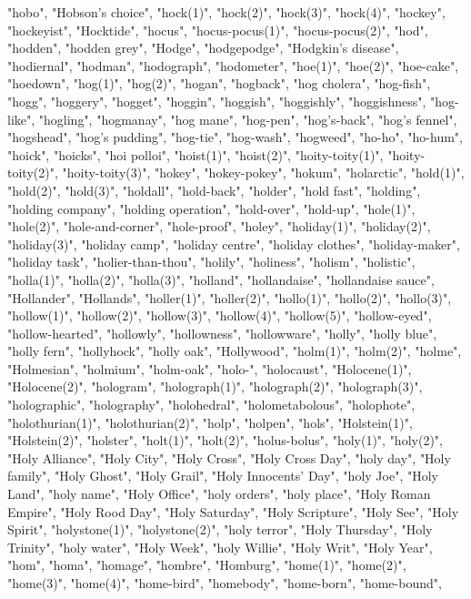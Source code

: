"hobo",
"Hobson's choice",
"hock(1)",
"hock(2)",
"hock(3)",
"hock(4)",
"hockey",
"hockeyist",
"Hocktide",
"hocus",
"hocus-pocus(1)",
"hocus-pocus(2)",
"hod",
"hodden",
"hodden grey",
"Hodge",
"hodgepodge",
"Hodgkin's disease",
"hodiernal",
"hodman",
"hodograph",
"hodometer",
"hoe(1)",
"hoe(2)",
"hoe-cake",
"hoedown",
"hog(1)",
"hog(2)",
"hogan",
"hogback",
"hog cholera",
"hog-fish",
"hogg",
"hoggery",
"hogget",
"hoggin",
"hoggish",
"hoggishly",
"hoggishness",
"hog-like",
"hogling",
"hogmanay",
"hog mane",
"hog-pen",
"hog's-back",
"hog's fennel",
"hogshead",
"hog's pudding",
"hog-tie",
"hog-wash",
"hogweed",
"ho-ho",
"ho-hum",
"hoick",
"hoicks",
"hoi polloi",
"hoist(1)",
"hoist(2)",
"hoity-toity(1)",
"hoity-toity(2)",
"hoity-toity(3)",
"hokey",
"hokey-pokey",
"hokum",
"holarctic",
"hold(1)",
"hold(2)",
"hold(3)",
"holdall",
"hold-back",
"holder",
"hold fast",
"holding",
"holding company",
"holding operation",
"hold-over",
"hold-up",
"hole(1)",
"hole(2)",
"hole-and-corner",
"hole-proof",
"holey",
"holiday(1)",
"holiday(2)",
"holiday(3)",
"holiday camp",
"holiday centre",
"holiday clothes",
"holiday-maker",
"holiday task",
"holier-than-thou",
"holily",
"holiness",
"holism",
"holistic",
"holla(1)",
"holla(2)",
"holla(3)",
"holland",
"hollandaise",
"hollandaise sauce",
"Hollander",
"Hollands",
"holler(1)",
"holler(2)",
"hollo(1)",
"hollo(2)",
"hollo(3)",
"hollow(1)",
"hollow(2)",
"hollow(3)",
"hollow(4)",
"hollow(5)",
"hollow-eyed",
"hollow-hearted",
"hollowly",
"hollowness",
"hollowware",
"holly",
"holly blue",
"holly fern",
"hollyhock",
"holly oak",
"Hollywood",
"holm(1)",
"holm(2)",
"holme",
"Holmesian",
"holmium",
"holm-oak",
"holo-",
"holocaust",
"Holocene(1)",
"Holocene(2)",
"hologram",
"holograph(1)",
"holograph(2)",
"holograph(3)",
"holographic",
"holography",
"holohedral",
"holometabolous",
"holophote",
"holothurian(1)",
"holothurian(2)",
"holp",
"holpen",
"hols",
"Holstein(1)",
"Holstein(2)",
"holster",
"holt(1)",
"holt(2)",
"holus-bolus",
"holy(1)",
"holy(2)",
"Holy Alliance",
"Holy City",
"Holy Cross",
"Holy Cross Day",
"holy day",
"Holy family",
"Holy Ghost",
"Holy Grail",
"Holy Innocents' Day",
"holy Joe",
"Holy Land",
"holy name",
"Holy Office",
"holy orders",
"holy place",
"Holy Roman Empire",
"Holy Rood Day",
"Holy Saturday",
"Holy Scripture",
"Holy See",
"Holy Spirit",
"holystone(1)",
"holystone(2)",
"holy terror",
"Holy Thursday",
"Holy Trinity",
"holy water",
"Holy Week",
"holy Willie",
"Holy Writ",
"Holy Year",
"hom",
"homa",
"homage",
"hombre",
"Homburg",
"home(1)",
"home(2)",
"home(3)",
"home(4)",
"home-bird",
"homebody",
"home-born",
"home-bound",
